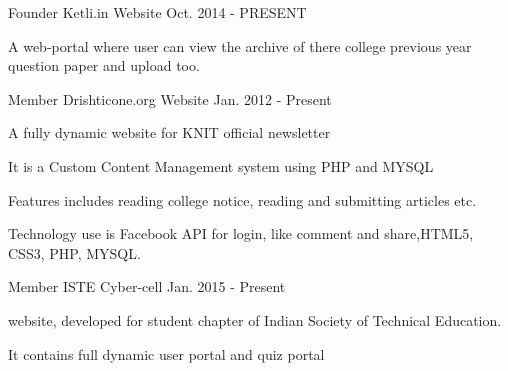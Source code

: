 \begin{cventries}
  \cventry
    {Founder}
    {Ketli.in}
    {Website}
    {Oct. 2014 - PRESENT}
    {
      \begin{cvitems}
        \item {A web-portal where user can view the archive of there college previous year question paper and upload too.}
      \end{cvitems}
    }
  \cventry
    {Member}
    {Drishticone.org}
    {Website}
    {Jan. 2012 - Present}
    {
      \begin{cvitems}
        \item {A fully dynamic website for KNIT official newsletter}
        \item {It is a Custom Content Management system using PHP and MYSQL}
        \item {Features includes reading college notice, reading and submitting articles etc.}
        \item {Technology use is Facebook API for login, like comment and share,HTML5, CSS3, PHP, MYSQL.}
      \end{cvitems}
    }
  \cventry
    {Member}
    {ISTE}
    {Cyber-cell}
    {Jan. 2015 - Present}
    {
      \begin{cvitems}
        \item {website, developed for student chapter of Indian Society of Technical Education.}
        \item {It contains full dynamic user portal and quiz portal}
      \end{cvitems}
    }
\end{cventries}
